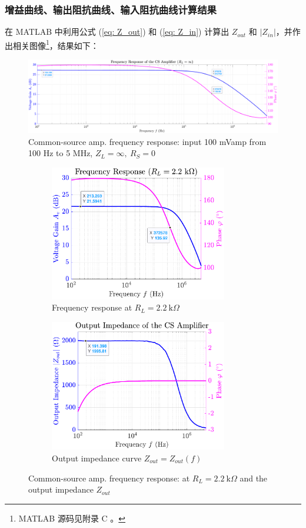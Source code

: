 \documentclass[UTF8]{article}
\begin{document}
\subsubsection{增益曲线、输出阻抗曲线、输入阻抗曲线计算结果}

在 MATLAB 中利用公式 (\ref{eq: Z_out}) 和 (\ref{eq: Z_in}) 计算出 $Z_{out}$ 和 $|Z_{in}|$，并作出相关图像\footnote{
MATLAB 源码见附录 C 。
}，结果如下：

\begin{figure}[H]\centering
    \includegraphics[width=\columnwidth]{LCE-04-场效应管/assets/cs amp/cs gain.pdf}
    \caption{Common-source amp. frequency response: input 100 mVamp from 100 Hz to 5 MHz, $Z_L = \infty,\ R_S = 0$}
\end{figure}

\begin{figure}[H]\centering
\begin{subfigure}[b]{0.5\columnwidth}\centering
    \includegraphics[width=220pt]{LCE-04-场效应管/assets/cs amp/cs gain, R_L = 2k2.pdf}
    \caption{Frequency response at $R_L = 2.2 \ \mathrm{k}\Omega$}
\end{subfigure}\hfill
\begin{subfigure}[b]{0.5\columnwidth}\centering
    \includegraphics[width=220pt]{LCE-04-场效应管/assets/cs amp/cs Z_out.pdf}
    \caption{Output impedance curve $Z_{out} = Z_{out}(f)$}
\end{subfigure}
\caption{Common-source amp. frequency response:  at $R_L = 2.2 \ \mathrm{k}\Omega$ and the output impedance $Z_{out}$}
\end{figure}
\end{document}
